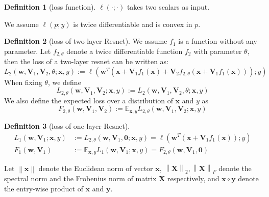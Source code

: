\documentclass{article}
\theoremstyle{plain}
\theoremstyle{definition}
\newtheorem{defn}{Definition}
\newcommand{\norm}[1]{\left\lVert#1\right\rVert}
\begin{document}
\begin{defn}[loss function]
	$\ell(\cdot;\cdot)$ takes two scalars as input.
\end{defn}

\begin{flushleft}
	We assume $\ell(p;y)$ is twice differentiable and is convex in $p$.
\end{flushleft}

\begin{defn}[loss of two-layer Resnet]
	We assume $f_1$ is a function without any parameter. Let $f_{2,\theta}$ denote a twice differentiable function $f_2$ with parameter $\theta$, then the loss of a two-layer resnet can be written as:
	\[L_2(\mathbf{w},\mathbf{V}_1,\mathbf{V}_2,\theta;\mathbf{x},y):=\ell\left(\mathbf{w}^T(\mathbf{x}+\mathbf{V}_1f_1(\mathbf{x})+\mathbf{V}_2f_{2,\theta}(\mathbf{x}+\mathbf{V}_1f_1(\mathbf{x})));y\right)\]
	When fixing $\theta$, we define
	\[L_{2,\theta}(\mathbf{w},\mathbf{V}_1,\mathbf{V}_2;\mathbf{x},y):=L_2(\mathbf{w},\mathbf{V}_1,\mathbf{V}_2,\theta;\mathbf{x},y)\]
	We also define the expected loss over a distribution of $\mathbf{x}$ and $y$ as
	\[F_{2,\theta}(\mathbf{w},\mathbf{V}_1,\mathbf{V}_2):=\mathbb{E}_{\mathbf{x},y}L_{2,\theta}(\mathbf{w},\mathbf{V}_1,\mathbf{V}_2;\mathbf{x},y)\]
\end{defn}

\begin{defn}[loss of one-layer Resnet]
	\begin{align*}
	L_1(\mathbf{w},\mathbf{V}_1;\mathbf{x},y)&:=L_{2,\theta}(\mathbf{w},\mathbf{V}_1,\mathbf{0};\mathbf{x},y)=\ell\left(\mathbf{w}^T(\mathbf{x}+\mathbf{V}_1f_1(\mathbf{x}));y\right)\\
	F_1(\mathbf{w},\mathbf{V}_1)&:=\mathbb{E}_{\mathbf{x},y}L_1(\mathbf{w},\mathbf{V}_1;\mathbf{x},y)=F_{2,\theta}(\mathbf{w},\mathbf{V}_1,\mathbf{0})
	\end{align*}
\end{defn}

\begin{flushleft}
	Let $\norm{\mathbf{x}}$ denote the Euclidean norm of vector $\mathbf{x}$, $\norm{\mathbf{X}}_2,\norm{\mathbf{X}}_F$ denote the spectral norm and the Frobenius norm of matrix $\mathbf{X}$ respectively, and $\mathbf{x}\circ\mathbf{y}$ denote the entry-wise product of $\mathbf{x}$ and $\mathbf{y}$.
\end{flushleft}
\end{document}
